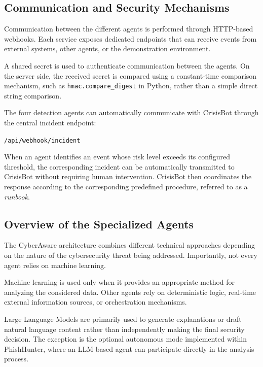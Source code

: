 \documentclass[12pt,a4paper]{report}
\newcommand{\ProjectName}{CyberAware}
\begin{document}
\subsection{Communication and Security Mechanisms}

Communication between the different agents is performed through HTTP-based webhooks. Each service exposes dedicated endpoints that can receive events from external systems, other agents, or the demonstration environment.

A shared secret is used to authenticate communication between the agents. On the server side, the received secret is compared using a constant-time comparison mechanism, such as \texttt{hmac.compare\_digest} in Python, rather than a simple direct string comparison.

The four detection agents can automatically communicate with CrisisBot through the central incident endpoint:

\begin{center}
\texttt{/api/webhook/incident}
\end{center}

When an agent identifies an event whose risk level exceeds its configured threshold, the corresponding incident can be automatically transmitted to CrisisBot without requiring human intervention. CrisisBot then coordinates the response according to the corresponding predefined procedure, referred to as a \emph{runbook}.

\subsection{Overview of the Specialized Agents}

The \ProjectName{} architecture combines different technical approaches depending on the nature of the cybersecurity threat being addressed. Importantly, not every agent relies on machine learning.

Machine learning is used only when it provides an appropriate method for analyzing the considered data. Other agents rely on deterministic logic, real-time external information sources, or orchestration mechanisms.

Large Language Models are primarily used to generate explanations or draft natural language content rather than independently making the final security decision. The exception is the optional autonomous mode implemented within PhishHunter, where an LLM-based agent can participate directly in the analysis process.
\end{document}
